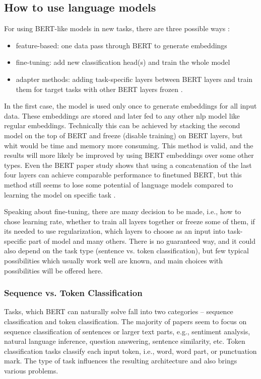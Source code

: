 \subsection{How to use language models}
 \label{sub:howto}
 For using BERT-like models in new tasks, there are three possible ways \citep{Liu2020}: 
 \begin{itemize}
 \item feature-based: one data pass through BERT to generate embeddings
 \item fine-tuning: add new classification head(s) and train the whole model
 \item adapter methods: adding task-specific layers between BERT layers and train them for target tasks with other BERT layers frozen \citep{Stickland2019}.
 \end{itemize}
In the first case, the model is used only once to generate embeddings for all input data. These embeddings are stored and later fed to any other \acrshort{nlp} model like regular embeddings. Technically this can be achieved by stacking the second model on the top of BERT and freeze (disable training) on BERT layers, but whit would be time and memory more consuming. This method is valid, and the results will more likely be improved by using BERT embeddings over some other types. Even the BERT paper study shows that using a concatenation of the last four layers can achieve comparable performance to finetuned BERT, but this method still seems to lose some potential of language models compared to learning the model on specific task \citep{Sun}.
\par
Speaking about fine-tuning, there are many decision to be made, i.e., how to chose learning rate, whether to train all layers together or freeze some of them, if its needed to use regularization, which layers to choose as an input into task-specific part of model and many others. There is no guaranteed way, and it could also depend on the task type (sentence vs. token classification), but few typical possibilities which usually work well are known, and main choices with possibilities will be offered here.

\subsubsection{Sequence vs. Token Classification}
Tasks, which BERT can naturally solve fall into two categories -- sequence classification and token classification. The majority of papers seem to focus on sequence classification of sentences or larger text parts, e.g., sentiment analysis, natural language inference, question answering, sentence similarity, etc. Token classification tasks classify each input token, i.e., word, word part, or punctuation mark. The type of task influences the resulting architecture and also brings various problems.
